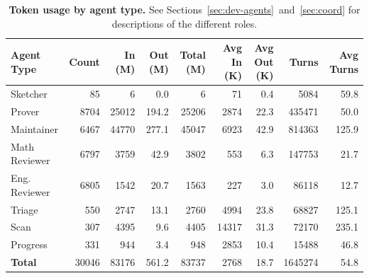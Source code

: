 \begin{table}[tbp]
\centering
\begin{tabular}{lrrrrrrrr}
\toprule
\textbf{Agent Type} & \textbf{Count} & \textbf{In (M)} & \textbf{Out (M)} & \textbf{Total (M)} & \textbf{Avg In (K)} & \textbf{Avg Out (K)} & \textbf{Turns} & \textbf{Avg Turns} \\
\midrule
Sketcher & 85 & 6 & 0.0 & 6 & 71 & 0.4 & 5084 & 59.8 \\
Prover & 8704 & 25012 & 194.2 & 25206 & 2874 & 22.3 & 435471 & 50.0 \\
Maintainer & 6467 & 44770 & 277.1 & 45047 & 6923 & 42.9 & 814363 & 125.9 \\
Math Reviewer & 6797 & 3759 & 42.9 & 3802 & 553 & 6.3 & 147753 & 21.7 \\
Eng. Reviewer & 6805 & 1542 & 20.7 & 1563 & 227 & 3.0 & 86118 & 12.7 \\
Triage & 550 & 2747 & 13.1 & 2760 & 4994 & 23.8 & 68827 & 125.1 \\
Scan & 307 & 4395 & 9.6 & 4405 & 14317 & 31.3 & 72170 & 235.1 \\
Progress & 331 & 944 & 3.4 & 948 & 2853 & 10.4 & 15488 & 46.8 \\
\midrule
\textbf{Total} & 30046 & 83176 & 561.2 & 83737 & 2768 & 18.7 & 1645274 & 54.8 \\
\bottomrule
\end{tabular}
\caption{\textbf{Token usage by agent type.} See Sections~\ref{sec:dev-agents}~and~\ref{sec:coord} for descriptions of the different roles.}
\label{tab:agent-tokens}
\end{table}



